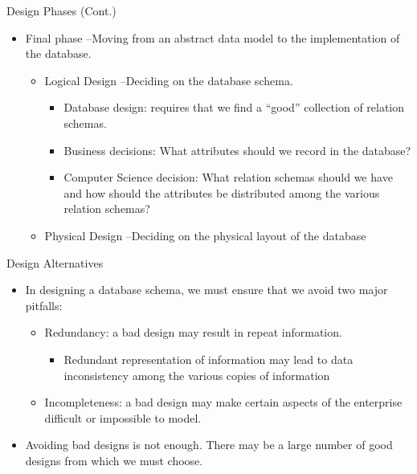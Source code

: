 \documentclass{beamer}
\begin{document}
\begin{frame}{Design Phases (Cont.)}
    \begin{itemize}
        \item Final phase --Moving from an abstract data model to the implementation of the database.
        \begin{itemize}
            \item Logical Design --Deciding on the database schema.
            \begin{itemize}
                \item Database design: requires that we find a ``good'' collection of relation schemas.
                \item Business decisions: What attributes should we record in the database?
                \item Computer Science decision: What relation schemas should we have and how should the attributes be distributed among the various relation schemas?
            \end{itemize}
            \item Physical Design --Deciding on the physical layout of the database
        \end{itemize}
    \end{itemize}
\end{frame}

\begin{frame}{Design Alternatives}
    \begin{itemize}
        \item In designing a database schema, we must ensure that we avoid two major pitfalls:
        \begin{itemize}
            \item Redundancy: a bad design may result in repeat information.
            \begin{itemize}
                \item Redundant representation of information may lead to data inconsistency among the various copies of information
            \end{itemize}
            \item Incompleteness: a bad design may make certain aspects of the enterprise difficult or impossible to model.
        \end{itemize}
        \item Avoiding bad designs is not enough. There may be a large number of good designs from which we must choose.
    \end{itemize}
\end{frame}
\end{document}
